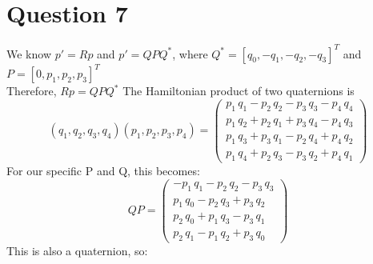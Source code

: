 \documentclass[11pt]{article}
\begin{document}
\section{Question 7}
We know $p' = Rp$ and $p' = QPQ^*$, where $Q^*=[q_0,-q_1,-q_2,-q_3]^T$ and $P=[0,p_1,p_2,p_3]^T$\\
Therefore, $Rp = QPQ^*$
The Hamiltonian product of two quaternions is 
$$
(q_1,q_2,q_3,q_4)(p_1,p_2,p_3,p_4)=\left(\begin{array}{c} p_{1}\,q_{1}-p_{2}\,q_{2}-p_{3}\,q_{3}-p_{4}\,q_{4}\\ p_{1}\,q_{2}+p_{2}\,q_{1}+p_{3}\,q_{4}-p_{4}\,q_{3}\\ p_{1}\,q_{3}+p_{3}\,q_{1}-p_{2}\,q_{4}+p_{4}\,q_{2}\\ p_{1}\,q_{4}+p_{2}\,q_{3}-p_{3}\,q_{2}+p_{4}\,q_{1} \end{array}\right)
$$
For our specific P and Q, this becomes:
$$
QP=\left(\begin{array}{c} -p_{1}\,q_{1}-p_{2}\,q_{2}-p_{3}\,q_{3}\\ p_{1}\,q_{0}-p_{2}\,q_{3}+p_{3}\,q_{2}\\ p_{2}\,q_{0}+p_{1}\,q_{3}-p_{3}\,q_{1}\\ p_{2}\,q_{1}-p_{1}\,q_{2}+p_{3}\,q_{0} \end{array}\right)
$$
This is also a quaternion, so:
\end{document}
